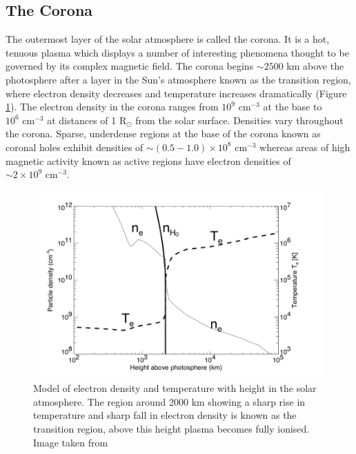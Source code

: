 \subsection{The Corona}
The outermost layer of the solar atmosphere is called the corona. It is a hot, tenuous plasma which displays a number of interesting phenomena thought to be governed by its complex magnetic field. The corona begins $\sim 2500$ km above the photosphere after a layer in the Sun's atmosphere known as the transition region, where electron density decreases and temperature increases dramatically (Figure \ref{fig:corona_temp}). The electron density in the corona ranges from $10^{9} \mbox{ cm}^{-3}$ at the base to $10^{6} \mbox{ cm}^{-3}$ at distances of 1 R$_{\odot}$ from the solar surface. Densities vary throughout the corona. Sparse, underdense regions at the base of the corona known as coronal holes exhibit densities of $\sim ( 0.5 - 1.0) \times 10^8 \mbox{ cm}^{-3}$ whereas areas of high magnetic activity known as active regions have electron densities of $\sim 2 \times 10^9 \mbox{ cm}^{-3}$.%
\begin{figure}
    \centering
    \includegraphics[width=0.75\columnwidth]{Images/Corona_temp.png}
    \caption[Model of electron density and temperature with height in the solar atmosphere.]{Model of electron density and temperature with height in the solar atmosphere. The region around 2000 km showing a sharp rise in temperature and sharp fall in electron density is known as the transition region, above this height plasma becomes fully ionised. Image taken from \cite{Aschwanden2004}}
    \label{fig:corona_temp}
\end{figure}%

